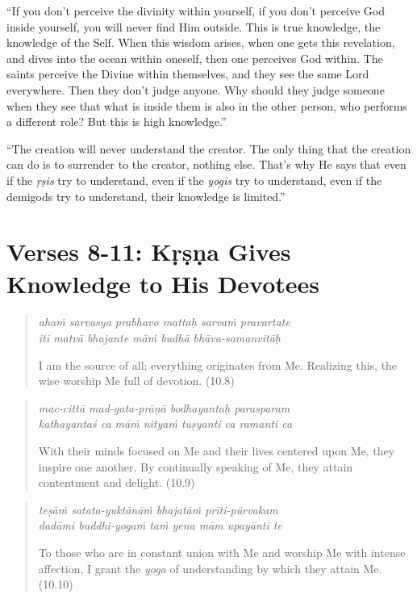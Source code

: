 \documentclass[12pt, twoside, openright]{memoir}
\begin{document}
\enquote{If you don’t perceive the divinity within yourself, if you don’t perceive God inside yourself, you will never find Him outside. This is true knowledge, the knowledge of the Self. When this wisdom arises, when one gets this revelation, and dives into the ocean within oneself, then one perceives God within. The saints perceive the Divine within themselves, and they see the same Lord everywhere. Then they don’t judge anyone. Why should they judge someone when they see that what is inside them is also in the other person, who performs a different role? But this is high knowledge.}

\enquote{The creation will never understand the creator. The only thing that the creation can do is to surrender to the creator, nothing else. That’s why He says that even if the \textit{ṛṣis} try to understand, even if the \textit{yogīs} try to understand, even if the demigods try to understand, their knowledge is limited.}

\newpage
\section{Verses 8-11: Kṛṣṇa Gives Knowledge to His Devotees}\label{sec-verses-8-11-krsna-gives-knowledge-to-his-devotees}


\par
\begin{verse}
\textit{ahaṁ sarvasya prabhavo mattaḥ sarvaṁ pravartate} \\
\textit{iti matvā bhajante māṁ budhā bhāva-samanvitāḥ}

\noindent I am the source of all; everything originates from Me. Realizing this, the wise worship Me full of devotion. (10.8)
\end{verse}
\par



\par
\begin{verse}
\textit{mac-cittā mad-gata-prāṇā bodhayantaḥ parasparam} \\
\textit{kathayantaś ca māṁ nityaṁ tuṣyanti ca ramanti ca}

\noindent With their minds focused on Me and their lives centered upon Me, they inspire one another. By continually speaking of Me, they attain contentment and delight. (10.9)
\end{verse}
\par



\par
\begin{verse}
\textit{teṣāṁ satata-yuktānāṁ bhajatāṁ prīti-pūrvakam} \\
\textit{dadāmi buddhi-yogaṁ taṁ yena mām upayānti te}

\noindent To those who are in constant union with Me and worship Me with intense affection, I grant the \textit{yoga} of understanding by which they attain Me. (10.10)
\end{verse}
\par
\end{document}
